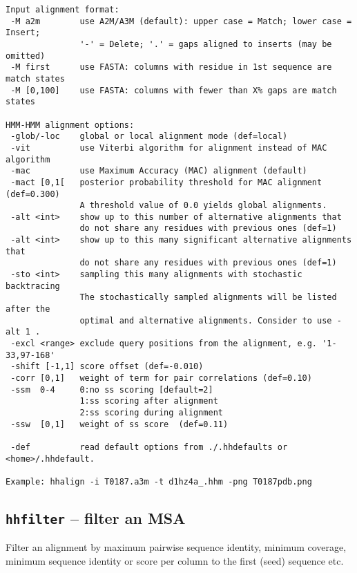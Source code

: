 \documentclass[11pt,a4paper]{article}
\begin{document}
\begin{verbatim}
Input alignment format:                                                     
 -M a2m        use A2M/A3M (default): upper case = Match; lower case = Insert;
               '-' = Delete; '.' = gaps aligned to inserts (may be omitted)   
 -M first      use FASTA: columns with residue in 1st sequence are match states
 -M [0,100]    use FASTA: columns with fewer than X% gaps are match states   

HMM-HMM alignment options:                                                  
 -glob/-loc    global or local alignment mode (def=local)         
 -vit          use Viterbi algorithm for alignment instead of MAC algorithm 
 -mac          use Maximum Accuracy (MAC) alignment (default)  
 -mact [0,1[   posterior probability threshold for MAC alignment (def=0.300) 
               A threshold value of 0.0 yields global alignments.
 -alt <int>    show up to this number of alternative alignments that
               do not share any residues with previous ones (def=1)
 -alt <int>    show up to this many significant alternative alignments that
               do not share any residues with previous ones (def=1)
 -sto <int>    sampling this many alignments with stochastic backtracing
               The stochastically sampled alignments will be listed after the
               optimal and alternative alignments. Consider to use -alt 1 .
 -excl <range> exclude query positions from the alignment, e.g. '1-33,97-168'
 -shift [-1,1] score offset (def=-0.010)                                      
 -corr [0,1]   weight of term for pair correlations (def=0.10)               
 -ssm  0-4     0:no ss scoring [default=2]               
               1:ss scoring after alignment                                  
               2:ss scoring during alignment                                 
 -ssw  [0,1]   weight of ss score  (def=0.11)                               

 -def          read default options from ./.hhdefaults or <home>/.hhdefault. 

Example: hhalign -i T0187.a3m -t d1hz4a_.hhm -png T0187pdb.png 
\end{verbatim} \normalsize

\subsection{{\tt hhfilter} -- filter an MSA}

Filter an alignment by maximum pairwise sequence identity, minimum coverage,
minimum sequence identity or score per column to the first (seed) sequence etc.
\end{document}
